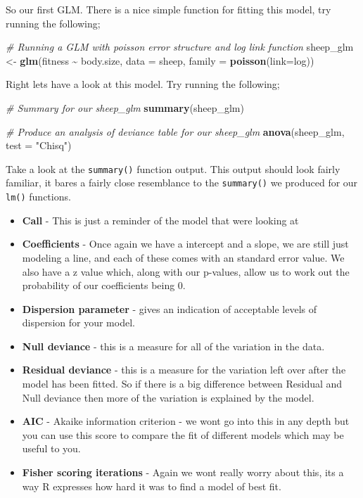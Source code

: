 \documentclass[
]{book}
\newenvironment{Shaded}{\begin{snugshade}}{\end{snugshade}}
\newcommand{\AttributeTok}[1]{\textcolor[rgb]{0.13,0.29,0.53}{#1}}
\newcommand{\CommentTok}[1]{\textcolor[rgb]{0.56,0.35,0.01}{\textit{#1}}}
\newcommand{\FunctionTok}[1]{\textcolor[rgb]{0.13,0.29,0.53}{\textbf{#1}}}
\newcommand{\NormalTok}[1]{#1}
\newcommand{\OtherTok}[1]{\textcolor[rgb]{0.56,0.35,0.01}{#1}}
\newcommand{\SpecialCharTok}[1]{\textcolor[rgb]{0.81,0.36,0.00}{\textbf{#1}}}
\newcommand{\StringTok}[1]{\textcolor[rgb]{0.31,0.60,0.02}{#1}}
\providecommand{\tightlist}{%
  \setlength{\itemsep}{0pt}\setlength{\parskip}{0pt}}
\begin{document}
So our first GLM. There is a nice simple function for fitting this model, try running the following;

\begin{Shaded}
\begin{Highlighting}[]
\CommentTok{\# Running a GLM with poisson error structure and log link function}
\NormalTok{sheep\_glm }\OtherTok{\textless{}{-}} \FunctionTok{glm}\NormalTok{(fitness }\SpecialCharTok{\textasciitilde{}}\NormalTok{ body.size, }\AttributeTok{data =}\NormalTok{ sheep, }\AttributeTok{family =} \FunctionTok{poisson}\NormalTok{(}\AttributeTok{link=}\NormalTok{log))}
\end{Highlighting}
\end{Shaded}

Right lets have a look at this model. Try running the following;

\begin{Shaded}
\begin{Highlighting}[]
\CommentTok{\# Summary for our sheep\_glm }
\FunctionTok{summary}\NormalTok{(sheep\_glm)}

\CommentTok{\# Produce an analysis of deviance table for our sheep\_glm}
\FunctionTok{anova}\NormalTok{(sheep\_glm, }\AttributeTok{test =} \StringTok{"Chisq"}\NormalTok{)}
\end{Highlighting}
\end{Shaded}

Take a look at the \texttt{summary()} function output. This output should look fairly familiar, it bares a fairly close resemblance to the \texttt{summary()} we produced for our \texttt{lm()} functions.

\begin{itemize}
\tightlist
\item
  \textbf{Call} - This is just a reminder of the model that were looking at
\item
  \textbf{Coefficients} - Once again we have a intercept and a slope, we are still just modeling a line, and each of these comes with an standard error value. We also have a z value which, along with our p-values, allow us to work out the probability of our coefficients being 0.
\item
  \textbf{Dispersion parameter} - gives an indication of acceptable levels of dispersion for your model.
\item
  \textbf{Null deviance} - this is a measure for all of the variation in the data.
\item
  \textbf{Residual deviance} - this is a measure for the variation left over after the model has been fitted. So if there is a big difference between Residual and Null deviance then more of the variation is explained by the model.
\item
  \textbf{AIC} - Akaike information criterion - we wont go into this in any depth but you can use this score to compare the fit of different models which may be useful to you.
\item
  \textbf{Fisher scoring iterations} - Again we wont really worry about this, its a way R expresses how hard it was to find a model of best fit.
\end{itemize}
\end{document}
